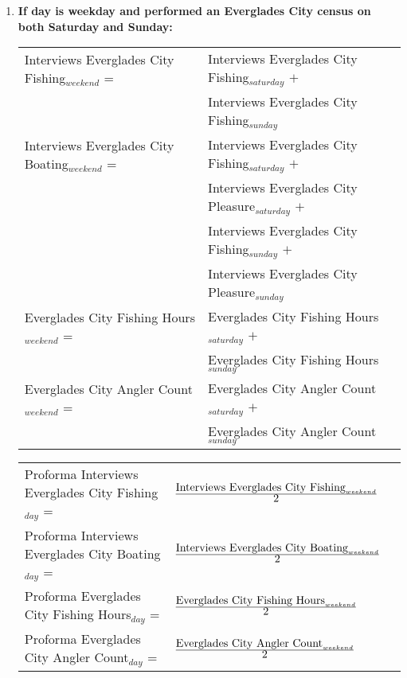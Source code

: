 \documentclass[letterpaper,12pt]{article}
\newcommand{\fraction}[1]{\textrm{\normalsize{#1}}}
\begin{document}
\begin{enumerate}
\item
\textbf{If day is weekday and performed an Everglades City census on both Saturday and Sunday:} \\
\begin{tabular}{l@{ }l@{ }l}
	Interviews Everglades City Fishing$_{weekend}$ =
		& Interviews Everglades City Fishing$_{saturday}$ $+$ \\
		& Interviews Everglades City Fishing$_{sunday}$ \\

	Interviews Everglades City Boating$_{weekend}$ =
		& Interviews Everglades City Fishing$_{saturday}$ $+$ \\
		& Interviews Everglades City Pleasure$_{saturday}$ $+$ \\
		& Interviews Everglades City Fishing$_{sunday}$ $+$ \\
		& Interviews Everglades City Pleasure$_{sunday}$ \\

	Everglades City Fishing Hours$_{weekend}$ =
		& Everglades City Fishing Hours$_{saturday}$ $+$ \\
		& Everglades City Fishing Hours$_{sunday}$ \\

	Everglades City Angler Count$_{weekend}$ =
		& Everglades City Angler Count$_{saturday}$ $+$ \\
		& Everglades City Angler Count$_{sunday}$ \\
\end{tabular}

\begin{tabular}{l@{ }l@{ }l}
	Proforma Interviews Everglades City Fishing$_{day}$ =
		& $
\frac
	{\fraction{Interviews Everglades City Fishing}_{weekend}}
      	{\fraction{2}}
		$ \\

	Proforma Interviews Everglades City Boating$_{day}$ =
		& $
\frac
	{\fraction{Interviews Everglades City Boating}_{weekend}}
      	{\fraction{2}}
		$ \\

	Proforma Everglades City Fishing Hours$_{day}$ =
		& $
\frac
	{\fraction{Everglades City Fishing Hours}_{weekend}}
	{\fraction{2}}
		$ \\

	Proforma Everglades City Angler Count$_{day}$ =
		& $
\frac
	{\fraction{Everglades City Angler Count}_{weekend}}
	{\fraction{2}}
		$ \\
\end{tabular}


\end{enumerate}
\end{document}
